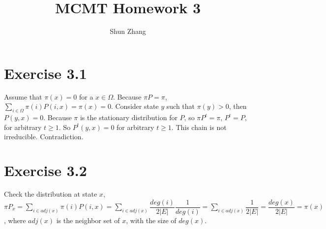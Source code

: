 \documentclass[10pt]{article}
\title{MCMT Homework 3}
\author{Shun Zhang}
\date{}
\begin{document}
\maketitle

\section*{Exercise 3.1}

Assume that $\pi(x) = 0$ for a $x \in \Omega$. Because $\pi P = \pi$, $\sum_{i
\in \Omega} \pi(i) P(i, x) = \pi(x) = 0$. Consider state $y$ such that $\pi(y) >
0$, then $P(y, x) = 0$. Because $\pi$ is the stationary distribution for $P$, so
$\pi P^t = \pi$, $P^t = P$, for arbitrary $t \geq 1$. So $P^t(y, x) = 0$ for
arbitrary $t \geq 1$. This chain is not irreducible. Contradiction.

\section*{Exercise 3.2}

Check the distribution at state $x$,
$\pi P_x = \sum_{i \in adj(x)} \pi(i) P(i, x) = \sum_{i \in adj(x)}
\dfrac{deg(i)}{2|E|} \dfrac{1}{deg(i)} = \sum_{i \in adj(x)} \dfrac{1}{2|E|}
= \dfrac{deg(x)}{2|E|}
= \pi(x)
$, where $adj(x)$ is the neighbor set of $x$, with the size of $deg(x)$.
\end{document}
